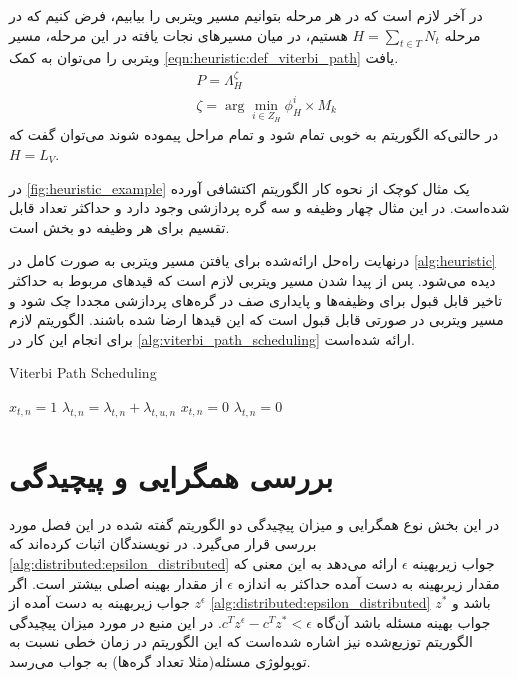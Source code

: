 در آخر لازم است که در هر مرحله بتوانیم مسیر ویتربی را بیابیم، فرض کنیم که در مرحله $\displaystyle H = \sum_{t \in T}N_t$ هستیم، در میان مسیرهای نجات یافته در این مرحله، مسیر ویتربی را می‌توان به کمک \cref{eqn:heuristic:def_viterbi_path} یافت.
\begin{subequations}
	\begin{align}\label{eqn:heuristic:def_viterbi_path}
		&P = \Lambda_H^\zeta \\
		&\zeta = \arg \min_{i \in Z_H} \phi_H^i \times M_k
	\end{align}
\end{subequations}
در حالتی‌که الگوریتم به خوبی تمام شود و تمام مراحل پیموده شوند می‌توان گفت که $H=L_V$.

در \cref{fig:heuristic_example} یک مثال کوچک از نحوه کار الگوریتم اکتشافی آورده شده‌است. در این مثال چهار وظیفه و سه گره پردازشی وجود دارد و حداکثر تعداد قابل تقسیم برای هر وظیفه دو بخش است.

درنهایت راه‌حل ارائه‌شده برای یافتن مسیر ویتربی به صورت کامل در \cref{alg:heuristic} دیده می‌شود. پس‌ از پیدا شدن مسیر ویتربی لازم است که قیدهای مربوط به حداکثر تاخیر قابل قبول برای وظیفه‌ها و پایداری صف در گره‌های پردازشی مجددا چک شود و مسیر ویتربی در صورتی قابل قبول است که این قیدها ارضا شده باشند. الگوریتم لازم برای انجام این کار در \cref{alg:viterbi_path_scheduling} ارا‌ئه شده‌است. 

\begin{latin}
	\begin{algorithm}
		\caption{Viterbi Path Scheduling}
		\label{alg:viterbi_path_scheduling}
		\begin{algorithmic}[1]
			\State $x_{t,n} = 1$
			\State $\lambda_{t,n} = \lambda_{t,n} + \lambda_{t,u,n}$
			\EndIf
			\State $x_{t,n} = 0$
			\State $\lambda_{t,n} = 0$
			\EndIf
			\EndFor
		\end{algorithmic}
	\end{algorithm}
\end{latin}


\section{بررسی همگرایی و پیچیدگی}
	در این بخش نوع همگرایی و میزان پیچیدگی دو الگوریتم گفته شده در این فصل مورد بررسی قرار می‌گیرد. 
	در \cite{testa2019distributed} نویسندگان اثبات کرده‌اند که \cref{alg:distributed:epsilon_distributed} جواب زیربهینه $\epsilon$ ارائه می‌دهد به این معنی که مقدار زیربهینه به دست آمده حداکثر به اندازه $\epsilon$ از مقدار بهینه اصلی بیشتر است. اگر $z^\epsilon$ جواب زیربهینه به دست آمده از \cref{alg:distributed:epsilon_distributed} باشد و $z^*$ جواب بهینه مسئله باشد آن‌گاه $c^Tz^\epsilon - c^Tz^* < \epsilon$.
	در این منبع در مورد میزان پیچیدگی الگوریتم توزیع‌شده نیز اشاره شده‌است که این الگوریتم در زمان خطی نسبت به توپولوژی مسئله(مثلا تعداد گره‌ها) به جواب می‌رسد. 
	
